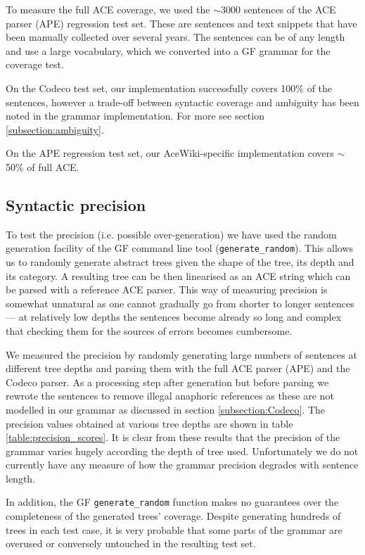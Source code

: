 \documentclass[a4paper]{article}
\begin{document}
To measure the full ACE coverage, we used the $\sim$3000 sentences of the ACE
parser (APE) regression test set. These are sentences and text
snippets that have been manually collected over several years. The sentences
can be of any length and use a large vocabulary, which we converted into
a GF grammar for the coverage test.

On the Codeco test set, our implementation successfully covers 100\% of the
sentences, however
a trade-off between syntactic coverage and ambiguity has been noted in the
grammar implementation. For more see section \ref{subsection:ambiguity}.

On the APE regression test set, our AceWiki-specific implementation covers
$\sim$50\% of full ACE.

\subsection{Syntactic precision}

To test the precision (i.e. possible over-generation) we have used the
random generation facility of the GF command line tool
(\verb!generate_random!). This allows us to randomly generate abstract
trees given the shape of the tree, its depth and its category. A
resulting tree can be then linearised as an ACE string which can be
parsed with a reference ACE parser.  This way of measuring precision
is somewhat unnatural as one cannot gradually go from shorter to
longer sentences --- at relatively low depths the sentences become
already so long and complex that checking them for the sources of
errors becomes cumbersome.

We measured the precision by randomly generating large numbers of
sentences at different tree depths and parsing them with the full ACE
parser (APE) and the Codeco parser. As a processing step after
generation but before parsing we rewrote the sentences to remove
illegal anaphoric references as these are not modelled in our grammar
as discussed in section \ref{subsection:Codeco}.  The precision values
obtained at various tree depths are shown in table
\ref{table:precision_scores}. It is clear from these results that the
precision of the grammar varies hugely according the depth of tree
used. Unfortunately we do not currently have any measure of how the grammar
precision degrades with sentence length.

In addition, the GF \verb!generate_random! function makes no
guarantees over the completeness of the generated trees'
coverage. Despite generating hundreds of trees in each test case, it
is very probable that some parts of the grammar are overused or
conversely untouched in the resulting test set.
\end{document}
